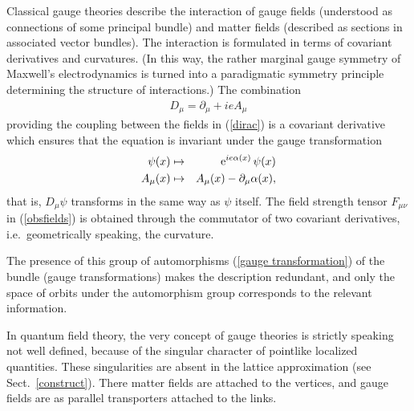 \documentclass[multphys,vecphys]{svmult}
\newcommand{\bea}{\begin{eqnarray}}
\newcommand{\eea}{\end{eqnarray}}
\begin{document}
Classical gauge theories describe the interaction of gauge fields 
(understood as connections of some principal bundle) and matter fields 
(described as sections in associated vector bundles). The interaction
is formulated in terms of covariant derivatives and curvatures. (In this way, the rather marginal gauge
symmetry of Maxwell's electrodynamics is turned into a paradigmatic
symmetry principle determining the structure of interactions.) The
combination 
\bea 
  D_\mu=\partial_\mu+ie A_\mu
\eea 
providing the coupling between the fields in (\ref{dirac}) is a
covariant derivative which ensures that the equation is invariant
under the gauge transformation     
\bea 
\label{gauge transformation}
  \psi(x)&\mapsto& \hbox{e}^{ie\alpha(x)}\,\psi(x) \nonumber \\ 
  A_\mu(x) &\mapsto& A_\mu(x) - \partial_\mu\alpha(x),
\eea 
that is, $D_\mu\psi$ transforms in the same way as $\psi$ itself. The
field strength tensor $F_{\mu\nu}$ in (\ref{obsfields}) is obtained
through the commutator of two covariant derivatives, i.e.\ geometrically speaking, the curvature.  

The presence of this group of automorphisms (\ref{gauge transformation}) 
of the bundle (gauge transformations) makes the description redundant,
and only the space of orbits under the automorphism group corresponds
to the relevant information.

In quantum field theory, the very concept of gauge theories is
strictly speaking not well defined, because of the singular character
of pointlike localized  quantities. These singularities are absent in
the lattice approximation (see
Sect.~\ref{construct}). There matter fields are attached to the
vertices, and gauge fields are as parallel transporters attached to
the links. 
 
\end{document}
